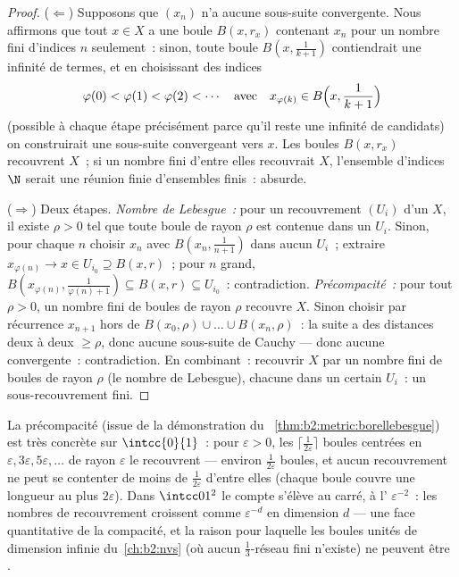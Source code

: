 \begin{proof}
($\Leftarrow$) Supposons que $(x_n)$ n'a aucune sous-suite
convergente. Nous affirmons que tout $x \in X$ a une boule $B(x,
r_x)$ contenant $x_n$ pour un nombre fini d'indices $n$ seulement~:
sinon, toute boule $B(x, \frac1{k+1})$ contiendrait une infinité de
termes, et en choisissant des indices
\[
\varphi(0) < \varphi(1) < \varphi(2) < \cdots
\quad\text{avec}\quad
x_{\varphi(k)} \in B\Bigl(x, \frac{1}{k+1}\Bigr)
\]
(possible à chaque étape précisément parce qu'il reste une infinité
de candidats) on construirait une sous-suite convergeant vers $x$.
Les boules $B(x, r_x)$ recouvrent $X$~; si un nombre fini d'entre
elles recouvrait $X$, l'ensemble d'indices $\N$ serait une réunion
finie d'ensembles finis~: absurde.

($\Rightarrow$) Deux étapes. \emph{Nombre de Lebesgue~:} pour un
recouvrement  $(U_i)$ d'un  $X$, il existe $\rho > 0$
tel que toute boule de rayon $\rho$ est contenue dans un $U_i$.
Sinon, pour chaque $n$ choisir $x_n$ avec $B(x_n, \frac{1}{n+1})$
dans aucun $U_i$~; extraire $x_{\varphi(n)} \to x \in U_{i_0}
\supseteq B(x, r)$~; pour $n$ grand, $B(x_{\varphi(n)},
\frac{1}{\varphi(n)+1}) \subseteq B(x, r) \subseteq U_{i_0}$~:
contradiction. \emph{Précompacité~:} pour tout $\rho > 0$, un nombre
fini de boules de rayon $\rho$ recouvre $X$. Sinon choisir par
récurrence $x_{n+1}$ hors de $B(x_0, \rho) \cup \dots \cup B(x_n,
\rho)$~: la suite a des distances deux à deux $\geq \rho$, donc
aucune sous-suite de Cauchy --- donc aucune convergente~:
contradiction. En combinant~: recouvrir $X$ par un nombre fini de
boules de rayon $\rho$ (le nombre de Lebesgue), chacune dans un
certain $U_i$~: un sous-recouvrement fini.
\end{proof}

\begin{example}\label{ex:b2:metric:epsnet}
La précompacité (issue de la démonstration du~%
\cref{thm:b2:metric:borellebesgue}) est très concrète sur
$\intcc{0}{1}$~: pour $\varepsilon > 0$, les $\lceil
\frac{1}{2\varepsilon}\rceil$ boules centrées en $\varepsilon,
3\varepsilon, 5\varepsilon, \dots$ de rayon $\varepsilon$ le
recouvrent --- environ $\frac1{2\varepsilon}$ boules, et aucun
recouvrement ne peut se contenter de moins de $\frac{1}{2\varepsilon}$
d'entre elles (chaque boule couvre une longueur au plus
$2\varepsilon$). Dans $\intcc01^2$ le compte s'élève au carré, à
l' $\varepsilon^{-2}$~: les nombres de recouvrement croissent
comme $\varepsilon^{-d}$ en dimension $d$ --- une face quantitative
de la compacité, et la raison pour laquelle les boules unités de
dimension infinie du~\cref{ch:b2:nvs} (où aucun
$\frac13$-réseau fini n'existe) ne peuvent être .
\end{example}

